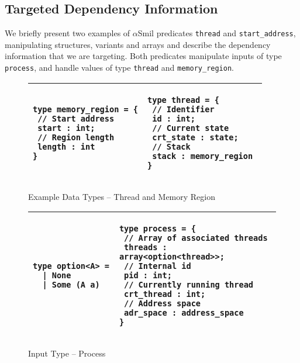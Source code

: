 \documentclass[11pt]{article}
\newcommand{\disp}[1]{\lstinline&#1&}
\def\asmil{\textsf{$\alpha$Smil}}
\begin{document}
 


\subsection{Targeted Dependency Information}\label{sec:intro:example}

We briefly present two examples of {\asmil} predicates \disp{thread}
and \disp{start_address}, 
manipulating structures, variants and arrays and describe the dependency 
information that we are targeting.
Both predicates manipulate inputs of type
\disp{process},  and handle values of type \disp{thread} and
\disp{memory_region}. 

\begin{figure}[hbtp]\centering
\begin{tabular}{ll}
\toprule
\begin{lstlisting}
type memory_region = {
 // Start address 
 start : int;  
 // Region length 
 length : int
}
\end{lstlisting}
&\begin{lstlisting}
type thread = {
 // Identifier
 id : int;
 // Current state 
 crt_state : state;
 // Stack 
 stack : memory_region 
}
\end{lstlisting} \\
\bottomrule
\end{tabular}
\caption{Example Data Types -- Thread and Memory Region}
\label{ex:atype}
\end{figure}

\begin{figure}[hbtp]\centering
\begin{tabular}{ll}
\toprule
\begin{lstlisting}
type option<A> = 
  | None
  | Some (A a)
\end{lstlisting}
&\begin{lstlisting}
type process = {
 // Array of associated threads 
 threads : array<option<thread>>;
 // Internal id
 pid : int; 
 // Currently running thread 
 crt_thread : int;
 // Address space 
 adr_space : address_space
}
\end{lstlisting}
\\
\bottomrule
\end{tabular}
\caption{Input Type -- Process}
\label{ex:itype}
\end{figure}
  
\end{document}
